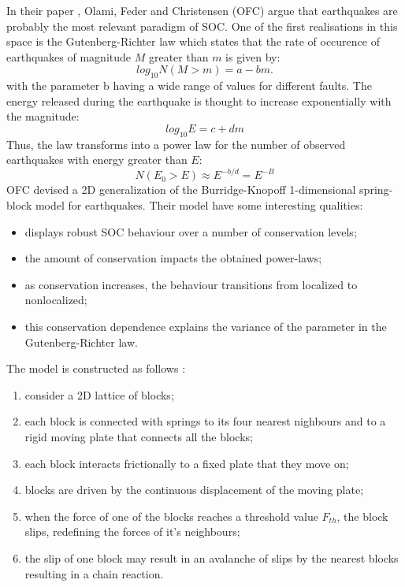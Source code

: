 In their paper \cite{OFC}, Olami, Feder and Christensen (OFC) argue that earthquakes are probably the most relevant paradigm of SOC. One of the first realisations in this space is the Gutenberg-Richter law which states that the rate of occurence of earthquakes of magnitude $M$ greater than $m$ is given by:
\begin{equation}
log_{10} N(M>m) = a- bm.
\end{equation}
with the parameter b having a wide range of values for different faults.
The energy released during the earthquake is thought to increase exponentially with the magnitude:
\begin{equation}
log_{10}E = c +dm
\end{equation}
Thus, the law transforms into a power law for the number of observed earthquakes with energy greater than $E$:
\begin{equation}
N(E_0>E) \approx E^{-b/d} = E^{-B}
\end{equation}
OFC devised a 2D generalization of the Burridge-Knopoff \cite{burridge} 1-dimensional spring-block model for earthquakes. Their model have some interesting qualities:
\begin{itemize}
	\item displays robust SOC behaviour over a number of conservation levels;
	\item the amount of conservation impacts the obtained power-laws;
	\item as conservation increases, the behaviour transitions from localized to nonlocalized;
	\item this conservation dependence explains the variance of the parameter in the Gutenberg-Richter law.
\end{itemize}
The model is constructed as follows :
\begin{enumerate}
	\item consider a 2D lattice of blocks;
	\item each block is connected with springs to its four nearest nighbours and to a rigid moving plate that connects all the blocks;
	\item each block interacts frictionally to a fixed plate that they move on;
	\item blocks are driven by the continuous displacement of the moving plate;
	\item when the force of one of the blocks reaches a threshold value $F_{th}$, the block slips, redefining the forces of it's neighbours;
	\item the slip of one block may result in an avalanche of slips by the nearest blocks resulting in a chain reaction.
\end{enumerate}

